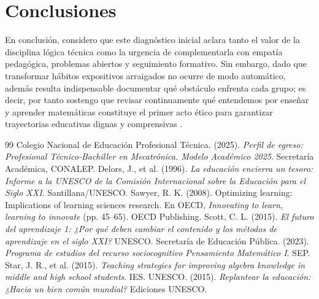 \documentclass[spanish,letterpaper,oneside]{article}
\begin{document}
\clearpage
\section{Conclusiones}
En conclusión, considero que este diagnóstico inicial aclara tanto el valor de la disciplina lógica técnica como la urgencia de complementarla con empatía pedagógica, problemas abiertos y seguimiento formativo. Sin embargo, dado que transformar hábitos expositivos arraigados no ocurre de modo automático, además resulta indispensable documentar qué obstáculo enfrenta cada grupo; es decir, por tanto sostengo que revisar continuamente qué entendemos por enseñar y aprender matemáticas constituye el primer acto ético para garantizar trayectorias educativas dignas y comprensivas \citep{delors1996educacion,unesco2015replantear}.

\clearpage
\begin{thebibliography}{99}
 Colegio Nacional de Educación Profesional Técnica. (2025). \textit{Perfil de egreso: Profesional Técnico-Bachiller en Mecatrónica. Modelo Académico 2025}. Secretaría Académica, CONALEP.
 Delors, J., et al. (1996). \textit{La educación encierra un tesoro: Informe a la UNESCO de la Comisión Internacional sobre la Educación para el Siglo XXI}. Santillana/UNESCO.
 Sawyer, R. K. (2008). Optimizing learning: Implications of learning sciences research. En OECD, \textit{Innovating to learn, learning to innovate} (pp. 45--65). OECD Publishing.
 Scott, C. L. (2015). \textit{El futuro del aprendizaje 1: ¿Por qué deben cambiar el contenido y los métodos de aprendizaje en el siglo XXI?} UNESCO.
 Secretaría de Educación Pública. (2023). \textit{Programa de estudios del recurso sociocognitivo Pensamiento Matemático I}. SEP.
 Star, J. R., et al. (2015). \textit{Teaching strategies for improving algebra knowledge in middle and high school students}. IES.
 UNESCO. (2015). \textit{Replantear la educación: ¿Hacia un bien común mundial?} Ediciones UNESCO.
\end{thebibliography}
\end{document}
